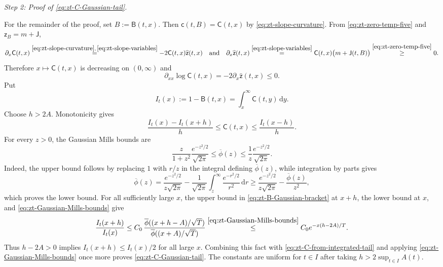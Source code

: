 \documentclass[10pt]{amsart}
\theoremstyle{definition}
\theoremstyle{remark}
\numberwithin{equation}{section}
\newcommand{\1}{\mathbf 1}
\newcommand{\dd}{\,\mathrm d}
\newcommand{\stackref}[2]{\stackrel{#2}{#1}}
\begin{document}
\smallskip
\noindent\emph{Step 2: Proof of \eqref{eq:zt-C-Gaussian-tail}.}

For the remainder of the proof, set $B:=\mathsf B(t,x)$. Then $\mathsf c(t,B)=\mathsf C(t,x)$ by \eqref{eq:zt-slope-curvature}. From \eqref{eq:zt-zero-temp-five} and $\mathsf z_B=m+\mathsf J$,
\begin{equation}
 \partial_x\mathsf C(t,x)
 \stackref{=}{\eqref{eq:zt-slope-curvature},\,\eqref{eq:zt-slope-variables}}
 -2\mathsf C(t,x)\widehat{\mathsf z}(t,x)
 \quad\text{and}\quad
 \partial_x\widehat{\mathsf z}(t,x)
 \stackref{=}{\eqref{eq:zt-slope-variables}}
 \mathsf C(t,x)\bigl(m+\mathsf J(t,B)\bigr)
 \stackref{\geq}{\eqref{eq:zt-zero-temp-five}}0.
 \label{eq:zt-Cz-x-relations}
\end{equation}
Therefore $x\mapsto\mathsf C(t,x)$ is decreasing on $(0,\infty)$ and
\begin{equation*}
 \partial_{xx}\log\mathsf C(t,x)=-2\partial_x\widehat{\mathsf z}(t,x)\leq0.
\end{equation*}
Put
\begin{equation*}
 I_t(x):=1-\mathsf B(t,x)=\int_x^\infty\mathsf C(t,y)\dd y.
\end{equation*}
Choose $h>2A$.  Monotonicity gives
\begin{equation}
 \frac{I_t(x)-I_t(x+h)}h\leq\mathsf C(t,x)
 \leq\frac{I_t(x-h)}h.
 \label{eq:zt-C-from-integrated-tail}
\end{equation}
For every $z>0$, the Gaussian Mills bounds are
\begin{equation}
 \frac{z}{1+z^2}\frac{e^{-z^2/2}}{\sqrt{2\pi}}
 \leq\overline\phi(z)
 \leq\frac1z\frac{e^{-z^2/2}}{\sqrt{2\pi}}.
 \label{eq:zt-Gaussian-Mills-bounds}
\end{equation}
Indeed, the upper bound follows by replacing $1$ with $r/z$ in the integral defining $\overline\phi(z)$, while integration by parts gives
\begin{equation*}
 \overline\phi(z)=\frac{e^{-z^2/2}}{z\sqrt{2\pi}}
 -\frac1{\sqrt{2\pi}}\int_z^\infty\frac{e^{-r^2/2}}{r^2}\dd r
 \geq\frac{e^{-z^2/2}}{z\sqrt{2\pi}}-\frac{\overline\phi(z)}{z^2},
\end{equation*}
which proves the lower bound. For all sufficiently large $x$, the upper bound in \eqref{eq:zt-B-Gaussian-bracket} at $x+h$, the lower bound at $x$, and \eqref{eq:zt-Gaussian-Mills-bounds} give
\begin{equation*}
 \frac{I_t(x+h)}{I_t(x)}
 \leq C_0\,
 \frac{\overline\phi((x+h-A)/\sqrt T)}
      {\overline\phi((x+A)/\sqrt T)}
 \stackref{\leq}{\eqref{eq:zt-Gaussian-Mills-bounds}}
 C_0e^{-x(h-2A)/T}.
\end{equation*}
Thus $h-2A>0$ implies $I_t(x+h)\leq I_t(x)/2$ for all large $x$. Combining this fact with \eqref{eq:zt-C-from-integrated-tail} and applying \eqref{eq:zt-Gaussian-Mills-bounds} once more proves \eqref{eq:zt-C-Gaussian-tail}. The constants are uniform for $t\in I$ after taking $h>2\sup_{t\in I}A(t)$.
\end{document}
